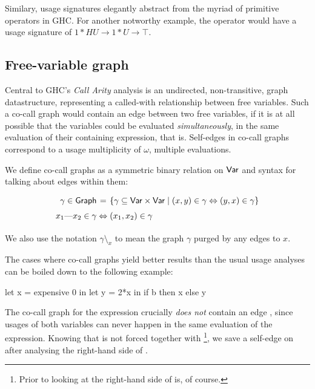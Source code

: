 Similary, usage signatures elegantly abstract from the myriad of primitive operators in GHC.
For another notworthy example, the  operator would have a usage signature of $1*HU \to 1*U \to \top$.

\subsection{Free-variable graph}\label{sec:graph}


Central to GHC's \emph{Call Arity} analysis \parencite{callarity} is an undirected, non-transitive, graph datastructure, representing a called-with relationship between free variables.
Such a co-call graph would contain an edge between two free variables, if it is at all possible that the variables could be evaluated \emph{simultaneously}, in the same evaluation of their containing expression, that is.
Self-edges in co-call graphs correspond to a usage multiplicity of $\omega$, \eg multiple evaluations.

We define co-call graphs as a symmetric binary relation on $\text{\textsf{Var}}$ and syntax for talking about edges within them:
\[\def\arraystretch{1.5}\arraycolsep=1.4pt
\begin{array}{rcl}
  \gamma \in \sGraph &=& \left\{ \gamma \subseteq \sVar \times \sVar \mid (x,y) \in \gamma \Leftrightarrow (y,x) \in \gamma \right\} \\
  \edge{x_1}{x_2}\in\gamma &\Leftrightarrow& (x_1,x_2) \in \gamma \\
\end{array}
\]

We also use the notation $\gamma \setminus_x$ to mean the graph $\gamma$ purged by any edges to $x$.

The cases where co-call graphs yield better results than the usual usage analyses can be boiled down to the following example:

\begin{haskellcode}
let x = expensive 0
in let y = 2*x
   in if b 
      then x 
      else y
\end{haskellcode}

The co-call graph for the  expression crucially \emph{does not} contain an edge , since usages of both variables can never happen in the same evaluation of the expression.
Knowing that  is not forced together with \footnote{Prior to looking at the right-hand side of  is, of course.}, we save a self-edge on  after analysing the right-hand side of .

